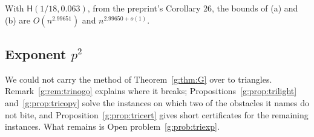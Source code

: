 \documentclass[11pt]{article}
\theoremstyle{definition}
\theoremstyle{remark}
\newcommand{\Hyp}{\mathsf{H}}
\begin{document}
With $\Hyp(1/18,0.063)$, from the preprint's Corollary 26, the bounds of (a) and (b) are $O(n^{2.99651})$ and $n^{2.99650+o(1)}$.

\subsection{Exponent \texorpdfstring{$p^2$}{p\^{}2}}\label{g:sec:triangle:p2}

We could not carry the method of Theorem~\ref{g:thm:G} over to triangles. Remark~\ref{g:rem:trinogo} explains where it breaks; Propositions~\ref{g:prop:trilight} and~\ref{g:prop:tricopy} solve the instances on which two of the obstacles it names do not bite, and Proposition~\ref{g:prop:tricert} gives short certificates for the remaining instances. What remains is Open problem~\ref{g:prob:triexp}.
\end{document}
